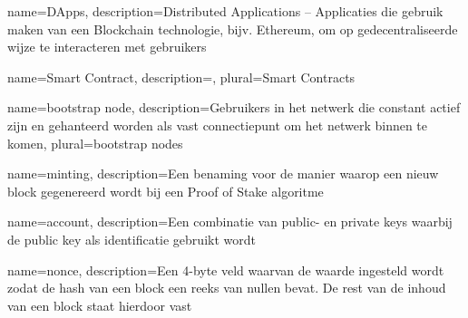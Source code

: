

 {
  name={DApps},
  description={Distributed Applications -- Applicaties die gebruik maken van een Blockchain technologie, bijv. Ethereum, om op gedecentraliseerde wijze te interacteren met gebruikers}
}

 {
  name={Smart Contract},
  description={},
  plural={Smart Contracts}
}




 {
  name={bootstrap node},
  description={Gebruikers in het netwerk die constant actief zijn en gehanteerd worden als vast connectiepunt om het netwerk binnen te komen},
  plural={bootstrap nodes}
}

 {
  name={minting},
  description={Een benaming voor de manier waarop een nieuw block gegenereerd wordt bij een Proof of Stake algoritme}
}

 {
  name={account},
  description={Een combinatie van public- en private keys waarbij de public key als identificatie gebruikt wordt}
}




 {
  name={nonce},
  description={Een 4-byte veld waarvan de waarde ingesteld wordt zodat de hash van een block een reeks van nullen bevat. De rest van de inhoud van een block staat hierdoor vast}
}

